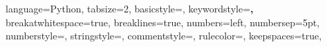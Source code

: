 \documentclass[a4paper, 12pt, twoside]{book}
\numberwithin{equation}{section}
\begin{document}
%



\lstset
{
language=Python, 
tabsize=2,  
basicstyle=\footnotesize, 
keywordstyle=\textbf,
breakatwhitespace=true,         %
breaklines=true,                 %
numbers=left,                    %
numbersep=5pt,                   %
numberstyle=\tiny\color{mygray}, %
stringstyle=\color{mymauve},
commentstyle=\color{mygreen},
rulecolor=\color{black},
keepspaces=true,                 %
}



\thispagestyle{empty}
\end{document}
